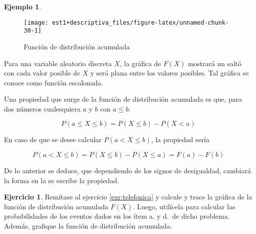 \documentclass[
]{book}
\theoremstyle{definition}
\theoremstyle{definition}
\newtheorem{example}{Ejemplo}[chapter]
\theoremstyle{definition}
\newtheorem{exercise}{Ejercicio}[chapter]
\theoremstyle{definition}
\theoremstyle{remark}
\begin{document}
\begin{example}
\begin{figure}

{\centering \texttt{[image: est1+descriptiva\_files/figure-latex/unnamed-chunk-30-1]} 

}

\caption{Función de distribución acumulada}\label{fig:unnamed-chunk-30}
\end{figure}

Para una variable aleatorio discreta \(X\), la gráfica de \(F(X)\) mostrará un saltó con cada valor posible de \(X\) y será plana entre los valores posibles. Tal gráfica se conoce como función escalonada.
\end{example}

Una propiedad que surge de la función de distribución acumulada es que, para dos números cualesquiera \(a\) y \(b\) con \(a\leq b\).

\begin{equation}
P(a\leq X \leq b) = P(X \leq b) - P(X < a)
\label{eq:fda2}
\end{equation}

En caso de que se desee calcular \(P(a < X \leq b)\), la propiedad sería

\begin{equation}
P(a < X \leq b) = P(X \leq b) - P(X \leq a) = F(a) - F(b)
\label{eq:fda3}
\end{equation}

De lo anterior se deduce, que dependiendo de los signos de desigualdad, cambiará la forma en la se escribe la propiedad.

\begin{exercise}
Remítase al ejercicio \ref{exr:telefonica} y calcule y trace la gráfica de la función de distribución acumulada \(F(X)\). Luego, utilícela para calcular las probabilidades de los eventos dados en los ítem a. y d.~de dicho problema. Además, grafique la función de distribución acumulada.
\end{exercise}
\end{document}
